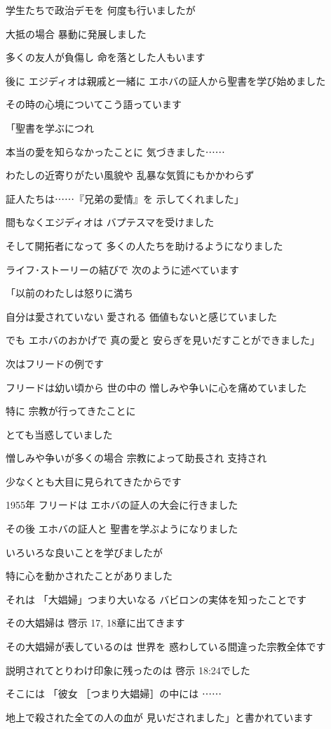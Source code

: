 \documentclass[twocolumn]{jsarticle}
\begin{document}
学生たちで政治デモを
何度も行いましたが

大抵の場合 暴動に発展しました

多くの友人が負傷し
命を落とした人もいます

後に エジディオは親戚と一緒に
エホバの証人から聖書を学び始めました

その時の心境についてこう語っています

「聖書を学ぶにつれ

本当の愛を知らなかったことに
気づきました⋯⋯

わたしの近寄りがたい風貌や
乱暴な気質にもかかわらず

証人たちは⋯⋯『兄弟の愛情』を
示してくれました」

間もなくエジディオは
バプテスマを受けました

そして開拓者になって
多くの人たちを助けるようになりました

ライフ･ストーリーの結びで
次のように述べています

「以前のわたしは怒りに満ち

自分は愛されていない 愛される
価値もないと感じていました

でも エホバのおかげで 真の愛と
安らぎを見いだすことができました」

次はフリードの例です

フリードは幼い頃から 世の中の
憎しみや争いに心を痛めていました

特に 宗教が行ってきたことに

とても当惑していました

憎しみや争いが多くの場合
宗教によって助長され 支持され

少なくとも大目に見られてきたからです

1955年 フリードは
エホバの証人の大会に行きました

その後 エホバの証人と
聖書を学ぶようになりました

いろいろな良いことを学びましたが

特に心を動かされたことがありました

それは 「大娼婦」つまり大いなる
バビロンの実体を知ったことです

その大娼婦は
啓示 17, 18章に出てきます

その大娼婦が表しているのは 世界を
惑わしている間違った宗教全体です

説明されてとりわけ印象に残ったのは
啓示 18:24でした

そこには 「彼女
［つまり大娼婦］の中には ⋯⋯

地上で殺された全ての人の血が
見いだされました」と書かれています
\end{document}
